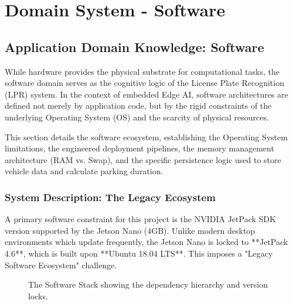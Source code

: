 %
%
\chapter{Domain System - Software} \label{ch:domain_system_software}
\section{Application Domain Knowledge: Software}
\label{sec:software_domain}

While hardware provides the physical substrate for computational tasks, the software domain serves as the cognitive logic of the License Plate Recognition (LPR) system. In the context of embedded Edge AI, software architectures are defined not merely by application code, but by the rigid constraints of the underlying Operating System (OS) and the scarcity of physical resources.

This section details the software ecosystem, establishing the Operating System limitations, the engineered deployment pipelines, the memory management architecture (RAM vs. Swap), and the specific persistence logic used to store vehicle data and calculate parking duration.

\subsection{System Description: The Legacy Ecosystem}

A primary software constraint for this project is the NVIDIA JetPack SDK version supported by the Jetson Nano (4GB). Unlike modern desktop environments which update frequently, the Jetson Nano is locked to **JetPack 4.6**, which is built upon **Ubuntu 18.04 LTS**. This imposes a "Legacy Software Ecosystem" challenge.

\vspace{0.5cm}

\begin{figure}[htbp]
	\centering
	
	\caption{The Software Stack showing the dependency hierarchy and version locks.}
	\label{fig:software_stack}
\end{figure}

